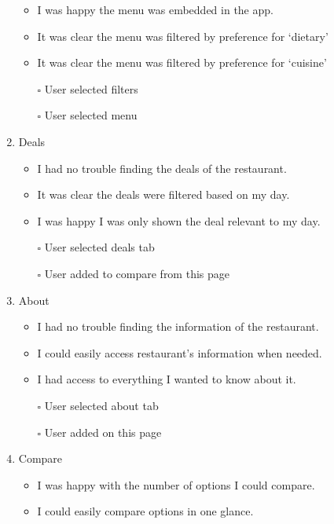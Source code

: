 \documentclass[a4 paper, 10pt]{article}
\begin{document}
\begin{multicols}{2}
\begin{enumerate}
\begin{itemize}
                    \item I was happy  the menu was embedded in the app.
                    \item It was clear the menu was filtered by preference for ‘dietary’
                    \item It was clear the menu was filtered by preference for ‘cuisine’                    
                    \item[$\square$] User selected filters
                    \item[$\square$] User selected menu
                \end{itemize}
            \item Deals
                \begin{itemize}
                    \item I had no trouble finding the deals of the restaurant.
                    \item It was clear the deals were filtered based on my day.
                    \item I was happy I was only shown the deal relevant to my day.                    
                    \item[$\square$] User selected deals tab
                    \item[$\square$] User added to compare from this page
                \end{itemize}
            \item About
                \begin{itemize}
                    \item I had no trouble finding the information of the restaurant.
                    \item I could easily access restaurant’s information when needed.      
                    \item I had access to everything I wanted to know about it.              
                    \item[$\square$] User selected about tab
                    \item[$\square$] User added on this page
                \end{itemize}
            \item Compare
                \begin{itemize}
                    \item I was happy with the number of options I could compare.
                    \item I could easily compare options in one glance.

\end{itemize}
\end{enumerate}
\end{multicols}
\end{document}
